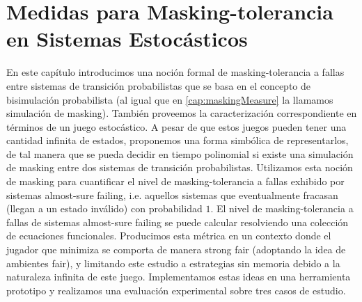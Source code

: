 \chapter{Medidas para Masking-tolerancia en Sistemas Estocásticos}
\label{cap:maskProb}

En este capítulo introducimos una noción formal de masking-tolerancia a fallas entre sistemas de transición probabilistas que se basa en el concepto de bisimulación probabilista (al igual que en \ref{cap:maskingMeasure} la llamamos simulación de masking). También proveemos la caracterización correspondiente en términos de un juego estocástico. A pesar de que estos juegos pueden tener una cantidad infinita de estados, proponemos una forma simbólica de representarlos, de tal manera que se pueda decidir en tiempo polinomial si existe una simulación de masking entre dos sistemas de transición probabilistas.
%
Utilizamos esta noción de masking para cuantificar el nivel de masking-tolerancia a fallas exhibido por sistemas almost-sure failing, i.e. aquellos sistemas que eventualmente fracasan (llegan a un estado inválido) con probabilidad $1$.
El nivel de masking-tolerancia a fallas de sistemas almost-sure failing se puede calcular resolviendo una colección de ecuaciones funcionales.
%
Producimos esta métrica en un contexto donde el jugador que minimiza se comporta de manera strong fair (adoptando la idea de ambientes fair), y limitando este estudio a estrategias sin memoria debido a la naturaleza infinita de este juego. 
Implementamos estas ideas en una herramienta prototipo y realizamos una evaluación experimental sobre tres casos de estudio.





